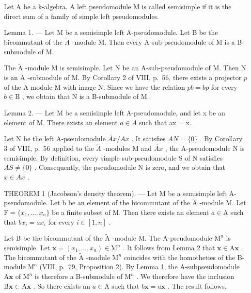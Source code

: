 Let A be a k-algebra. A left pseudomodule M is called semisimple if it is the direct sum of a family of simple left pseudomodules.

Lemma 1. --- Let M be a semisimple left A-pseudomodule. Let B be the bicommutant of the \(\widetilde{A}\) -module M. Then every A-sub-pseudomodule of M is a B-submodule of M.

The \(\widetilde{\mathrm{A}}\) -module M is semisimple. Let N be an A-sub-pseudomodule of M. Then N is an \(\widetilde{\mathrm{A}}\) -submodule of M. By Corollary 2 of VIII, p.~56, there exists a projector \(p\) of the A-module M with image N. Since we have the relation \(pb = bp\) for every \(b \in \mathrm{B}\) , we obtain that N is a B-submodule of M.

Lemma 2. --- Let M be a semisimple left A-pseudomodule, and let x be an element of M. There exists an element \(a \in A\) such that ax = x.

Let N be the left A-pseudomodule \(\widetilde{Ax}/Ax\) . It satisfies \(AN = \{0\}\) . By Corollary 3 of VIII, p.~56 applied to the \(\widetilde{A}\) -modules M and \(\widetilde{Ax}\) , the A-pseudomodule N is semisimple. By definition, every simple sub-pseudomodule S of N satisfies \(AS \neq \{0\}\) . Consequently, the pseudomodule N is zero, and we obtain that \(x \in Ax\) .

THEOREM 1 (Jacobson's density theorem). --- Let M be a semisimple left A-pseudomodule. Let b be an element of the bicommutant of the \(\widetilde{\mathrm{A}}\) -module M. Let \(\mathrm{F} = \{x_1, \ldots, x_n\}\) be a finite subset of M. Then there exists an element \(a \in \mathrm{A}\) such that \(bx_i = ax_i\) for every \(i \in [1, n]\) .

Let B be the bicommutant of the \(\widetilde{\mathrm{A}}\) -module M. The A-pseudomodule \(\mathrm{M}^n\) is semisimple. Let \(\boldsymbol{x} = (x_1, \ldots, x_n) \in \mathrm{M}^n\) . It follows from Lemma 2 that \(\boldsymbol{x} \in \mathrm{A}\boldsymbol{x}\) . The bicommutant of the \(\widetilde{\mathrm{A}}\) -module \(\mathrm{M}^n\) coincides with the homotheties of the B-module \(\mathrm{M}^n\) (VIII, p.~79, Proposition 2). By Lemma 1, the A-subpseudomodule \(\mathrm{A}\boldsymbol{x}\) of \(\mathrm{M}^n\) is therefore a B-submodule of \(\mathrm{M}^n\) . We therefore have the inclusion \(\mathrm{B}\boldsymbol{x} \subset \mathrm{A}\boldsymbol{x}\) . So there exists an \(a \in \mathrm{A}\) such that \(b\boldsymbol{x} = a\boldsymbol{x}\) . The result follows.
